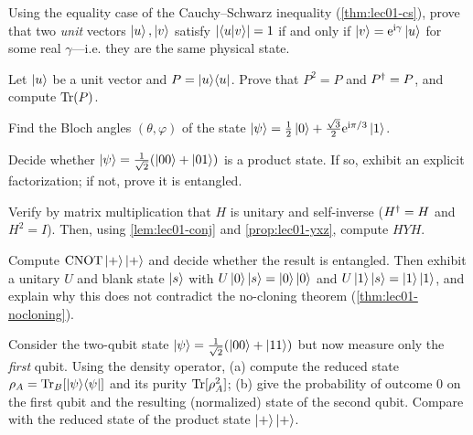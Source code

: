 \begin{exercise}\label{ex:lec01-3}
Using the equality case of the Cauchy--Schwarz inequality
(\cref{thm:lec01-cs}), prove that two \emph{unit} vectors $\ket{u},\ket{v}$ satisfy
$\left\lvert \braket{u|v} \right\rvert=1$ if and only if $\ket{v}=\mathrm{e}^{\mathrm{i}\gamma}\ket{u}$ for some real
$\gamma$---i.e. they are the same physical state.
\end{exercise}

\begin{exercise}\label{ex:lec01-4}
Let $\ket{u}$ be a unit vector and $P=\ket{u}\!\bra{u}$. Prove that $P^{2}=P$ and $P^{\dagger}=P$,
and compute $\operatorname{Tr}(P)$.
\end{exercise}

\begin{exercise}\label{ex:lec01-5}
Find the Bloch angles $(\theta,\varphi)$ of the state
$\ket{\psi}=\tfrac{1}{2}\ket{0}+\tfrac{\sqrt3}{2}\mathrm{e}^{\mathrm{i}\pi/3}\ket{1}$.
\end{exercise}

\begin{exercise}\label{ex:lec01-6}
Decide whether $\ket{\psi}=\tfrac{1}{\sqrt2}(\ket{00}+\ket{01})$ is a product state.
If so, exhibit an explicit factorization; if not, prove it is entangled.
\end{exercise}

\begin{exercise}\label{ex:lec01-7}
Verify by matrix multiplication that $H$ is unitary and self-inverse
($H^{\dagger}=H$ and $H^{2}=I$). Then, using \cref{lem:lec01-conj} and
\cref{prop:lec01-yxz}, compute $HYH$.
\end{exercise}

\begin{exercise}\label{ex:lec01-8}
Compute $\mathrm{CNOT}\ket{+}\ket{+}$ and decide whether the result is entangled. Then
exhibit a unitary $U$ and blank state $\ket{s}$ with $U\ket{0}\ket{s}=\ket{0}\ket{0}$
and $U\ket{1}\ket{s}=\ket{1}\ket{1}$, and explain why this does not contradict the
no-cloning theorem (\cref{thm:lec01-nocloning}).
\end{exercise}

\begin{exercise}\label{ex:lec01-9}
Consider the two-qubit state $\ket{\psi}=\tfrac{1}{\sqrt2}(\ket{00}+\ket{11})$ but now
measure only the \emph{first} qubit. Using the density operator, (a) compute the
reduced state $\rho_A=\operatorname{Tr}_B[\ket{\psi}\!\bra{\psi}]$ and its purity $\operatorname{Tr}[\rho_A^{2}]$;
(b) give the probability of outcome $0$ on the first qubit and the resulting
(normalized) state of the second qubit. Compare with the reduced state of the
product state $\ket{+}\ket{+}$.
\end{exercise}

